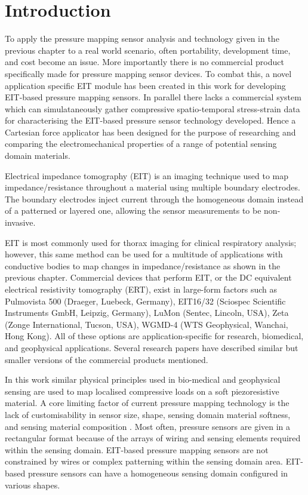 \section{Introduction}
To apply the pressure mapping sensor analysis and technology given in the previous chapter to a real world scenario, often portability, development time, and cost become an issue. More importantly there is no commercial product specifically made for pressure mapping sensor devices. To combat this, a novel application specific EIT module has been created in this work for developing EIT-based pressure mapping sensors. In parallel there lacks a commercial system which can simulataneously gather compressive spatio-temporal stress-strain data for characterising the EIT-based pressure sensor technology developed. Hence a Cartesian force applicator has been designed for the purpose of researching and comparing the electromechanical properties of a range of potential sensing domain materials. 

Electrical impedance tomography (EIT) is an imaging technique used to map impedance/resistance throughout a material using multiple boundary electrodes. The boundary electrodes inject current through the homogeneous domain instead of a patterned or layered one, allowing the sensor measurements to be non-invasive. 

EIT is most commonly used for thorax imaging for clinical respiratory analysis; however, this same method can be used for a multitude of applications with conductive bodies to map changes in impedance/resistance as shown in the previous chapter. Commercial devices that perform EIT, or the DC equivalent electrical resistivity tomography (ERT), exist in large-form factors such as Pulmovista 500 (Draeger, Luebeck, Germany), EIT16/32 (Sciospec Scientific Instruments GmbH, Leipzig, Germany), LuMon (Sentec, Lincoln, USA), Zeta (Zonge International, Tucson, USA), WGMD-4 (WTS Geophysical, Wanchai, Hong Kong). All of these options are application-specific for research, biomedical, and geophysical applications. Several research papers \cite{Chen2023,Hong2015,Lee2020,Li2023,Soleimani2006,Suh2022,Tiwari2022,Xu2022,Zhang2015,Zhang2016} have described similar but smaller versions of the commercial products mentioned.

In this work similar physical principles used in bio-medical and geophysical sensing are used to map localised compressive loads on a soft piezoresistive material. A core limiting factor of current pressure mapping technology is the lack of customisability in sensor size, shape, sensing domain material softness, and sensing material composition \cite{Gilanizadehdizaj2022,Rossiter2005,Liang2015,Fu2020}. Most often, pressure sensors are given in a rectangular format because of the arrays of wiring and sensing elements required within the sensing domain. EIT-based pressure mapping sensors are not constrained by wires or complex patterning within the sensing domain area. EIT-based pressure sensors can have a homogeneous sensing domain configured in various shapes. 

